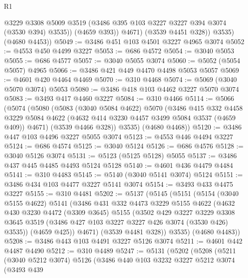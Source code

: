\begin{lexlean}{R1}
\begin{coremodule}
                @3229
                @3308
                @5009
                @3519
                (@3486 @395 @103 @3227 @3227 @394 @3074 (@3530 @394) @3535))
              (@4659 @393))
            @4671)
          (@3539 @4451 @328))
        @3535)
      (@4680 @4453))
@5049 := @3486 @451 @103 @4501 @3227 @4965 @3074
@5052 := @4553 @450 @4499 @3227
@5053 := @686 @4572
@5054 := @3040 @5053
@5055 := @686 @4577
@5057 := @3040 @5055 @3074
@5060 := @5052 (@5054 @5057) @4965
@5066 := @3486 @421 @449 @4470 @4498 @5053 @5057
@5069 := @4601 @420 @4464 @4469
@5070 := @310 @4468
@5074 := @5069 (@3040 @5070 @3074) @5053
@5080 := @3486 @418 @103 @4462 @3227 @5070 @3074
@5083 := @3493 @417 @4460 @3227
@5084 := @310 @4466
@5114 := @5066
    (@5074
      (@5080
        (@5083
          (@3040 @5084 @4622)
          @5070
          (@3486
            @415
            @332
            @4458
            @3229
            @5084
            @4622
            (@4632 @414 @3230 @4457 @3499 @5084 @3537 (@4659 @409))
            @4671)
          (@3539 @4466 @328))
        @3535)
      (@4680 @4468))
@5120 := @3486 @447 @103 @4496 @3227 @5055 @3074
@5123 := @4553 @446 @4494 @3227
@5124 := @686 @4574
@5125 := @3040 @5124
@5126 := @686 @4576
@5128 := @3040 @5126 @3074
@5131 := @5123 (@5125 @5128) @5055
@5137 := @3486 @437 @445 @4485 @4493 @5124 @5128
@5140 := @4601 @436 @4479 @4484
@5141 := @310 @4483
@5145 := @5140 (@3040 @5141 @3074) @5124
@5151 := @3486 @434 @103 @4477 @3227 @5141 @3074
@5154 := @3493 @433 @4475 @3227
@5155 := @310 @4481
@5202 := @5137
    (@5145
      (@5151
        (@5154
          (@3040 @5155 @4622)
          @5141
          (@3486
            @431
            @332
            @4473
            @3229
            @5155
            @4622
            (@4632
              @430
              @3230
              @4472
              (@3309 @3645)
              @5155
              (@3502
                @429
                @3227
                @3229
                @3308
                @3645
                @3519
                (@3486 @427 @103 @3227 @3227 @426 @3074 (@3530 @426) @3535))
              (@4659 @425))
            @4671)
          (@3539 @4481 @328))
        @3535)
      (@4680 @4483))
@5208 := @3486 @443 @103 @4491 @3227 @5126 @3074
@5211 := @4601 @442 @4487 @4490
@5212 := @310 @4489
@5247 := @5131
    (@5202
      (@5208
        (@5211
          (@3040 @5212 @3074)
          @5126
          (@3486
            @440
            @103
            @3232
            @3227
            @5212
            @3074
            (@3493
              @439

\end{coremodule}
\end{lexlean}
